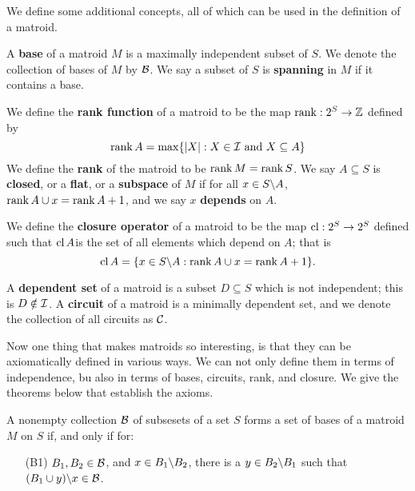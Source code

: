 We define some additional concepts, all of which can be used in the definition of a matroid.

\begin{definition}
    A \textbf{base} of a matroid $M$ is a maximally independent subset of  $S$. We denote the
    collection of bases of $M$ by  $\mathcal{B}$. We say a subset of  $S$ is \textbf {spanning} in $M$ if it
    contains a base.
\end{definition}

\begin{definition}
    We define the \textbf{rank function} of a matroid to be the map $\operatorname{rank}:2^S \rightarrow \mathbb{Z}$
    defined by
        \begin{equation}
        \operatorname{rank}{A}=\max\{|X|:X \in \mathcal{I} \text{ and } X \subseteq A\}
        \end{equation} 
    We define the \textbf{rank} of the matroid to be $\operatorname{rank}{M}=\operatorname{rank}{S}$. We say $A \subseteq S$ is
    \textbf{closed}, or a \textbf{flat}, or a \textbf{subspace} of $M$ if for all  $x \in
    S\backslash A$, $\operatorname{rank}{A \cup x}=\operatorname{rank}{A}+1$, and we say $x$ \textbf{depends} on $A$.
\end{definition}

\begin{definition}
    We define the \textbf{closure operator} of a matroid to be the map $\operatorname{cl}:2^S \rightarrow 2^S$
    defined such that  $\operatorname{cl}{A}$is the set of all elements which depend on $A$; that is
        \begin{equation}
            \operatorname{cl}{A}=\{x \in S\backslash A:\operatorname{rank}{A \cup x}=\operatorname{rank}{A}+1\}.
        \end{equation}
\end{definition}

\begin{definition}
    A \textbf{dependent set} of a matroid is a subset $D \subseteq S$ which is not independent; this
    is $D \notin \mathcal{I}$. A \textbf {circuit} of a matroid is a minimally dependent set, and we denote
    the collection of all circuits as $\mathcal{C}$.
\end{definition}

Now one thing that makes matroids so interesting, is that they can be axiomatically defined in
various ways. We can not only define them in terms of independence, bu also in terms of bases,
circuits, rank, and closure. We give the theorems below that establish the axioms.

\begin{theorem}\label{1.1.1}
    A nonempty collection $\mathcal{B}$ of subsesets of a set $S$ forms a set of bases of a matroid $M$ on
    $S$ if, and only if for:
        \begin{enumerate}
            \item[(B1)] $ B_1,B_2 \in \mathcal{B}$, and $x \in B_1\backslash B_2$, there is a $y \in
                B_2\backslash B_1$ such that $(B_1 \cup y)\backslash x \in \mathcal{B}$.
        \end{enumerate}
\end{theorem}

